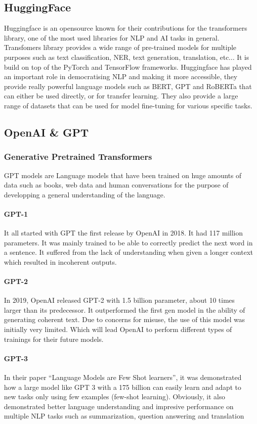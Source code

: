 \documentclass[a4paper,12pt,twoside]{report}
\begin{document}
\subsection{HuggingFace}
Huggingface\cite{huggingface} is an opensource known for their contributions for the transformers library, one of the most used libraries for NLP and AI tasks in general. 
Transfomers library provides a wide range of pre-trained models for multiple purposes such as text classification, NER, text generation, translation, etc... It is build on top of the PyTorch and TensorFlow frameworks.
Huggingface has played an important role in democratising NLP and making it more accessible, they provide really powerful language models such as BERT, GPT and RoBERTa that can either be used directly, or for transfer learning. They also provide a large range of datasets that can be used for model fine-tuning for various specific tasks.

\subsection{OpenAI \& GPT}
\subsubsection{Generative Pretrained Transformers}
GPT models are Language models that have been trained on huge amounts of data such as books, web data and human conversations for the purpose of developping a general understanding of the language. 
\paragraph{GPT-1}
It all started with GPT the first release by OpenAI\cite{openai} in 2018. It had 117 million parameters. It was mainly trained to be able to correctly predict the next word in a sentence. It suffered from the lack of understanding when given a longer context which resulted in incoherent outputs.
\paragraph{GPT-2}
In 2019, OpenAI released GPT-2 with 1.5 billion parameter, about 10 times larger than its predecessor. It outperformed the first gen model in the ability of generating coherent text. Due to concerns for misuse, the use of this model was initially very limited. Which will lead OpenAI to perform different types of trainings for their future models.
\paragraph{GPT-3}
In their paper ``Language Models are Few Shot learners''\cite{brown2020language}, it was demonstrated how a large model like GPT 3 with a 175 billion can easily learn and adapt to new tasks only using few examples (few-shot learning). Obviously, it also demonstrated better language understanding and impresive performance on multiple NLP tasks such as summarization, question answering and translation
\end{document}
